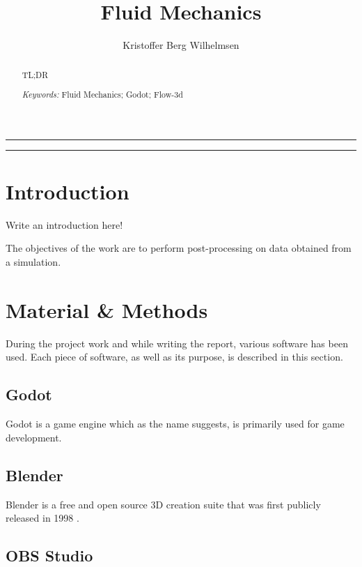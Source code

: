 \documentclass[a4paper,11pt]{extarticle}
\title{Fluid Mechanics}
\author{Kristoffer Berg Wilhelmsen}
\date{\parbox{\linewidth}{\centering
    \textit{\small UiT - The Arctic University of Norway, P.O. Box 385, N-8505 Narvik, Norway}\endgraf\bigskip
    \small Submitted \today
}}
\providecommand{\keywords}[1]{\flushleft\textit{\small{Keywords:}} #1}
\begin{document}
\maketitle

\noindent\rule{\linewidth}{.5pt}
\begin{abstract}
  TL;DR

  \keywords{\small{Fluid Mechanics}; \small{Godot}; \small{Flow-3d}}
\end{abstract}
\rule{\linewidth}{.5pt}


\section{Introduction}
Write an introduction here!

The objectives of the work are to perform post-processing on data obtained from a simulation.

\lipsum[2-4]

\section{Material \& Methods}
During the project work and while writing the report, various software has been used. Each piece of software, as well as its purpose, is described in this section.

\subsection{Godot}
Godot is a game engine which as the name suggests, is primarily used for game development.

\subsection{Blender}
Blender is a free and open source 3D creation suite that was first publicly released in 1998 \citep{blender:birthday}.
\subsection{OBS Studio}
\end{document}

